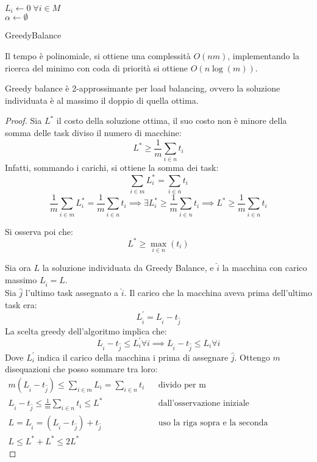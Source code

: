 \begin{algorithm}[H]
    \SetAlgoLined
     $L_i \gets 0\;\forall i \in M$\\
     $\alpha \gets \emptyset$\\
     \Return{$\alpha$}
     \caption{GreedyBalance}
\end{algorithm}
Il tempo è polinomiale, si ottiene una complessità $O(nm)$, implementando 
la ricerca del minimo con coda di priorità si ottiene $O(n\log(m))$.
\begin{theorem}
    Greedy balance è 2-approssimante per load balancing, ovvero la soluzione
    individuata è al massimo il doppio di quella ottima.
\end{theorem}
\begin{proof}
    Sia $L^*$ il costo della soluzione ottima, il suo costo non è minore
    della somma delle task diviso il numero di macchine:
    $$L^* \geq \frac{1}{m}\sum_{i \in n} t_i$$
    Infatti, sommando i carichi, si ottiene la somma dei task:
    $$\sum_{i \in m} L_i^* = \sum_{i \in n} t_i$$
    $$\frac{1}{m}\sum_{i \in m} L_i^* = \frac{1}{m}\sum_{i \in n} t_i 
    \implies \exists L_i^* \geq \frac{1}{m}\sum_{i \in n} t_i 
    \implies L^* \geq \frac{1}{m}\sum_{i \in n} t_i$$
    
    Si osserva poi che:
    $$L^* \geq \max_{i \in n}(t_i)$$

    Sia ora $L$ la soluzione individuata da Greedy Balance, e $\hat{i}$
    la macchina con carico massimo $L_{\hat{i}} = L$.\\
    Sia $\hat{j}$ l'ultimo task assegnato a $\hat{i}$. Il carico 
    che la macchina aveva prima dell'ultimo task era:
    $$L_{\hat{i}}^\prime = L_{\hat{i}} - t_{\hat{j}}$$
    La scelta greedy dell'algoritmo implica che:
        $$L_{\hat{i}} - t_{\hat{j}} \leq L_{i}^\prime \forall i \implies L_{\hat{i}} - t_{\hat{j}} \leq L_{i} \forall i$$
    Dove $L_i^\prime$ indica il carico della macchina i prima di assegnare $\hat{j}$. 
    Ottengo $m$ disequazioni che posso sommare tra loro:
    \begin{equation}
        \begin{aligned}
            m(L_{\hat{i}} - t_{\hat{j}}) \leq \sum_{i \in m}L_{i} =  \sum_{i \in n}t_{i} && \text{divido per m}\\
            L_{\hat{i}} - t_{\hat{j}} \leq \frac{1}{m}\sum_{i \in n}t_{i} \leq L^* && \text{dall'osservazione iniziale}\\
            L = L_{\hat{i}} = (L_{\hat{i}} - t_{\hat{j}}) + t_{\hat{j}}  && \text{uso la riga sopra e la seconda osservazione}\\
            L \leq L^* + L^* \leq 2L^*
        \end{aligned}
    \end{equation}

\end{proof}
